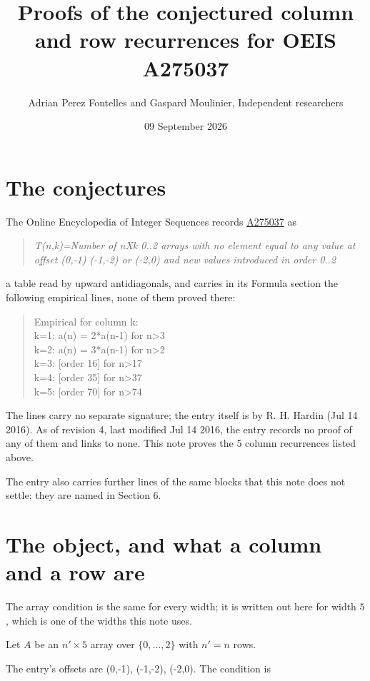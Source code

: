 \documentclass[11pt]{article}
\title{Proofs of the conjectured column and row recurrences for OEIS A275037}
\author{Adrian Perez Fontelles and Gaspard Moulinier, Independent researchers}
\date{09 September 2026}
\theoremstyle{definition}
\begin{document}
\maketitle
\section{The conjectures}

The Online Encyclopedia of Integer Sequences records \href{https://oeis.org/A275037}{A275037} as

\begin{quote}\itshape T(n,k)=Number of nXk 0..2 arrays with no element equal to any value at offset (0,-1) (-1,-2) or (-2,0) and new values introduced in order 0..2\end{quote}

a table read by upward antidiagonals, and carries in its Formula section the following empirical lines, none of them proved there:

\begin{quote}\ttfamily Empirical for column k:\\
k=1: a(n) = 2*a(n-1) for n>3\\k=2: a(n) = 3*a(n-1) for n>2\\k=3: [order 16] for n>17\\k=4: [order 35] for n>37\\k=5: [order 70] for n>74\end{quote}

The lines carry no separate signature; the entry itself is by R. H. Hardin (Jul 14 2016). As of revision 4, last modified Jul 14 2016, the entry records no proof of any of them and links to none. This note proves the 5 column recurrences listed above.

The entry also carries further lines of the same blocks that this note does not settle; they are named in Section 6.

\section{The object, and what a column and a row are}

The array condition is the same for every width; it is written out here for width $5$, which is one of the widths this note uses.

Let $A$ be an $n' \times 5$ array over $\{0,\dots,2\}$ with $n' = n$ rows.

The entry's offsets are (0,-1), (-1,-2), (-2,0). The condition is
\end{document}
